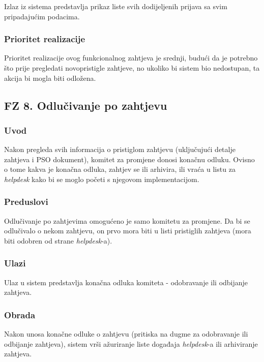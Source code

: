 \documentclass[12pt,a4paper]{article}
\begin{document}
Izlaz iz sistema predstavlja prikaz liste svih dodijeljenih prijava sa svim pripadajućim podacima.

\subsubsection{Prioritet realizacije}

Prioritet realizacije ovog funkcionalnog zahtjeva je srednji, budući da je potrebno što prije pregledati novopristigle zahtjeve, no ukoliko bi sistem bio nedostupan, ta akcija bi mogla biti odložena.

\subsection{FZ 8. Odlučivanje po zahtjevu}

\subsubsection{Uvod}

Nakon pregleda svih informacija o pristiglom zahtjevu (uključujući detalje zahtjeva i PSO dokument), komitet za promjene donosi konačnu odluku. Ovisno o tome kakva je konačna odluka, zahtjev se ili arhivira, ili vraća u listu za \textit{helpdesk} kako bi se moglo početi s njegovom implementacijom.

\subsubsection{Preduslovi}

Odlučivanje po zahtjevima omogućeno je samo komitetu za promjene. Da bi se odlučivalo o nekom zahtjevu, on prvo mora biti u listi pristiglih zahtjeva (mora biti odobren od strane \textit{helpdesk}-a).

\subsubsection{Ulazi}

Ulaz u sistem predstavlja konačna odluka komiteta - odobravanje ili odbijanje zahtjeva.

\subsubsection{Obrada}

Nakon unosa konačne odluke o zahtjevu (pritiska na dugme za odobravanje ili odbijanje zahtjeva), sistem vrši ažuriranje liste događaja \textit{helpdesk}-a ili arhiviranje zahtjeva.
\end{document}
